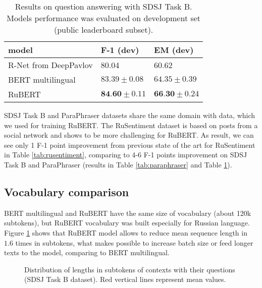 \documentclass{article}
\begin{document}
\begin{table}[ht!]
\centering
\begin{tabular}{l|l|l}
\hline
model                 & F-1 (dev) & EM (dev) \\ \hline
R-Net from DeepPavlov \cite{burtsev2018deeppavlov} & 80.04     & 60.62    \\ \hline \hline
BERT multilingual     & $83.39\pm0.08$     & $64.35\pm0.39$    \\ \hline
RuBERT                & $\textbf{84.60}\pm0.11$     & $\textbf{66.30}\pm0.24$    \\ \hline
\end{tabular}
\caption{Results on question answering with SDSJ Task B. Models performance was evaluated on development set (public leaderboard subset).}
\label{tab:squad}
\end{table}

SDSJ Task B and ParaPhraser datasets share the same domain with data, which we used for training RuBERT. The RuSentiment dataset is based on posts from a social network and shows to be more challenging for RuBERT. As result, we can see only 1 F-1 point improvement from previous state of the art for RuSentiment in Table \ref{tab:rusentiment}, comparing to 4-6 F-1 points improvement on SDSJ Task B and ParaPhraser (results in Table \ref{tab:paraphraser} and Table \ref{tab:squad}).

\subsection{Vocabulary comparison}
BERT multilingual and RuBERT have the same size of vocabulary (about 120k subtokens), but RuBERT vocabulary was built especially for Russian language. Figure \ref{fig:vocab_hist} shows that RuBERT model allows to reduce mean sequence length in $1.6$ times in subtokens, what makes possible to increase batch size or feed longer texts to the model, comparing to BERT multilingual.

\begin{figure}[ht]\centering
    \qquad
    \caption{Distribution of lengths in subtokens of contexts with their questions (SDSJ Task B dataset). Red vertical lines represent mean values.}\label{fig:vocab_hist}\end{figure}
\end{document}
